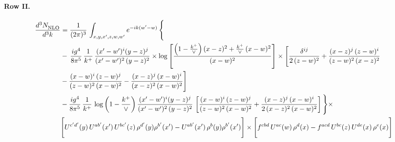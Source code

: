 \documentclass[10pt]{article}
\numberwithin{equation}{section}
\begin{document}
\paragraph{Row II.}
\begin{align}
     \frac{d^{3}N_{\rm NLO}^{\rm}}{d^{3}k}  & =   \frac{1}{(2\pi)^{3}}\, \int_{x,y,x',z,w,w^{\prime}} e^{-ik(w^{\prime}-w)}\, \Bigg\{\notag \\
& -\,\frac{ig^{4}}{8\pi^{5}}\,\frac{1}{k^{+}}\,\frac{(x'-w')^{i}(y-z)^{j}}{(x'-w')^{2}\,(y-z)^{2}}\times \log{\left[\frac{\left(1-\frac{k^{+}}{\vee}\right)(x-z)^{2}+\frac{k^{+}}{\vee}\,(x-w)^{2}}{(x-w)^{2}}\right]}\times \Bigg[\frac{\delta^{ij}}{2\,(z-w)^{2}}+\frac{(x-z)^{j}\,(z-w)^{i}}{(z-w)^{2}\,(x-z)^{2}}\notag \\ & -\frac{(x-w)^{i}\,(z-w)^{j}}{(z-w)^{2}\,(x-w)^{2}}-\frac{(x-z)^{j}\,(x-w)^{i}}{(x-z)^{2}\,(x-w)^{2}}\Bigg] \notag \\
& -\frac{ig^{4}}{8\pi^{5}}\,\frac{1}{k^{+}}\,\log{\left(1-\frac{k^{+}}{\vee}\right)}\,\frac{(x'-w')^{i}(y-z)^{j}}{(x'-w')^{2}\,(y-z)^{2}}\,\left[\frac{(x-w)^{i}\,(z-w)^{j}}{(z-w)^{2}\,(x-w)^{2}}+\frac{(x-z)^{j}\,(x-w)^{i}}{2\,(x-z)^{2}\, (x-w)^{2}}\right]\Bigg\}\times \notag \\ & \Bigg[U^{c'd'}(y)\,U^{ab'}(x')\,U^{bc'}(z)\,\rho^{d'}(y)\rho^{b'}(x')-U^{ab'}(x')\,\rho^{b}(y)\rho^{b'}(x')\Bigg]\times\Bigg[f^{cbd}\,U^{ac}(w)\,\rho^{d}(x)-f^{acd}\, U^{bc}(z)\,U^{de}(x)\,\rho^{e}(x)\Bigg]
\end{align}
\end{document}
